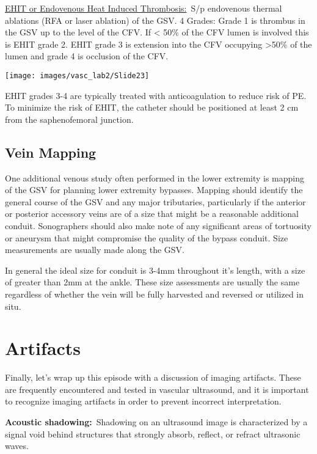 \documentclass[
]{book}
\begin{document}
\uline{EHIT or Endovenous Heat Induced Thrombosis:}~S/p endovenous
thermal ablations (RFA or laser ablation) of the GSV. 4 Grades: Grade 1
is thrombus in the GSV up to the level of the CFV. If \textless{} 50\% of the CFV
lumen is involved this is EHIT grade 2. EHIT grade 3 is extension into
the CFV occupying \textgreater50\% of the lumen and grade 4 is occlusion of the
CFV.

\texttt{[image: images/vasc\_lab2/Slide23]}

EHIT grades 3-4 are typically treated with anticoagulation to reduce
risk of PE. To minimize the risk of EHIT, the catheter should be
positioned at least 2 cm from the saphenofemoral junction.

\hypertarget{vein-mapping}{%
\subsection{Vein Mapping}\label{vein-mapping}}

One additional venous study often performed in the lower extremity is
mapping of the GSV for planning lower extremity bypasses. Mapping should
identify the general course of the GSV and any major tributaries,
particularly if the anterior or posterior accessory veins are of a size
that might be a reasonable additional conduit. Sonographers should also
make note of any significant areas of tortuosity or aneurysm that might
compromise the quality of the bypass conduit. Size measurements are
usually made along the GSV.

In general the ideal size for conduit is 3-4mm throughout it's length,
with a size of greater than 2mm at the ankle.\citep{leopold1989} These size
assessments are usually the same regardless of whether the vein will be
fully harvested and reversed or utilized in situ.

\hypertarget{artifacts}{%
\section{Artifacts}\label{artifacts}}

Finally, let's wrap up this episode with a discussion of imaging
artifacts. These are frequently encountered and tested in vascular
ultrasound, and it is important to recognize imaging artifacts in order
to prevent incorrect interpretation.

\textbf{Acoustic shadowing:}~Shadowing on an ultrasound image is
characterized by a signal void behind structures that strongly absorb,
reflect, or refract ultrasonic waves.
\end{document}
